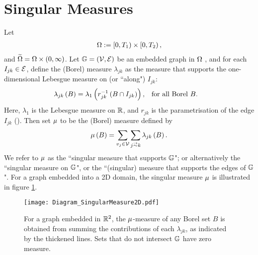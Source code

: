 \section{Singular Measures} \label{sec:SingularMeasures}

Let 
\begin{align*}
	\Omega:= \left[0,T_1\right)\times\left[0,T_2\right), 
\end{align*}
and $\widetilde{\Omega} = \Omega \times \left( 0,\infty \right)$.
Let $\mathbb{G} = \left( \mathcal{V},\mathcal{E} \right)$ be an embedded graph in $\Omega$ , and for each $I_{jk}\in \mathcal{E}$, define the (Borel) measure $\lambda_{jk}$ as the measure that supports the one-dimensional Lebesgue measure on (or ``along") $I_{jk}$:
\begin{align*}
	\lambda_{jk}\left( B \right) = \lambda_{1}\left( r_{jk}^{-1}\left( B \cap I_{jk} \right) \right),
	&\quad\text{for all Borel } B.
\end{align*}
Here, $\lambda_1$ is the Lebesgue measure on $\mathbb{R}$, and $r_{jk}$ is the parametrisation of the edge $I_{jk}$ ().
Then set $\mu$ to be the (Borel) measure defined by
\begin{align*}
	\ddmes\bracs{B} = \sum_{v_j\in \vertSet}\sum_{j\conLeft k} \lambda_{jk}\bracs{B}.
\end{align*}
We refer to $\mu$ as the ``singular measure that supports $\mathbb{G}$"; or alternatively the ``singular measure on $\mathbb{G}$", or the ``(singular) measure that supports the edges of $\mathbb{G}$".
For a graph embedded into a 2D domain, the singular measure $\mu$ is illustrated in figure \ref{fig:Diagram_SingularMeasure2D}.
\begin{figure}[b!]
	\centering
	\texttt{[image: Diagram\_SingularMeasure2D.pdf]}
	\caption{\label{fig:Diagram_SingularMeasure2D} For a graph embedded in $\mathbb{R}^2$, the $\mu$-measure of any Borel set $B$ is obtained from summing the contributions of each $\lambda_{jk}$, as indicated by the thickened lines.
	Sets that do not intersect $\mathbb{G}$ have zero measure.}
\end{figure}

